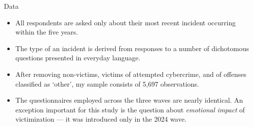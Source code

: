 \documentclass{beamer}
\begin{document}
	\begin{frame}{Data}
		\begin{itemize}
			\item All respondents are asked only about their most recent incident occurring within the five years. 
			\item The type of an incident is derived from responses to a number of dichotomous questions presented in everyday language.
			\item After removing non-victims, victims of attempted cybercrime, and of offenses classified as `other', my sample consists of 5,697 observations.
			\item 	The questionnaires employed across the three waves are nearly identical.
			An exception important for this study is the question about \textit{emotional impact} of victimization --- it was introduced only in the 2024 wave. 
		\end{itemize}
	\end{frame}
	
\end{document}

